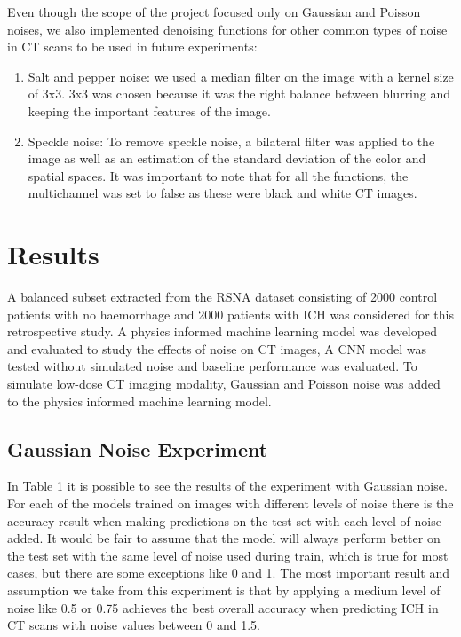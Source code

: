 \documentclass{article}
\begin{document}
\begin{par}
    Even though the scope of the project focused only on Gaussian and Poisson noises, we also implemented denoising functions for other common types of noise in CT scans to be used in future experiments:
    \begin{enumerate}
        \item Salt and pepper noise: we used a median filter on the image with a kernel size of 3x3. 3x3 was chosen because it was the right balance between blurring and keeping the important features of the image. 
        \item Speckle noise: To remove speckle noise, a bilateral filter was applied to the image as well as an estimation of the standard deviation of the color and spatial spaces. It was important to note that for all the functions, the multichannel was set to false as these were black and white CT images.
    \end{enumerate}
\end{par}

\newpage
\section{Results}

\begin{par}
A balanced subset extracted from the RSNA dataset consisting of 2000 control patients with no haemorrhage and 2000 patients with ICH was considered for this retrospective study. A physics informed machine learning model was developed and evaluated to study the effects of noise on CT images, A CNN model was tested without simulated noise and baseline performance was evaluated. To simulate low-dose CT imaging modality, Gaussian and Poisson noise was added to the physics informed machine learning model. 
\end{par}

\subsection{Gaussian Noise Experiment}
In Table 1 it is possible to see the results of the experiment with Gaussian noise. For each of the models trained on images with different levels of noise there is the accuracy result when making predictions on the test set with each level of noise added. It would be fair to assume that the model will always perform better on the test set with the same level of noise used during train, which is true for most cases, but there are some exceptions like 0 and 1.
The most important result and assumption we take from this experiment is that by applying a medium level of noise like 0.5 or 0.75 achieves the best overall accuracy when predicting ICH in CT scans with noise values between 0 and 1.5.
\end{document}
